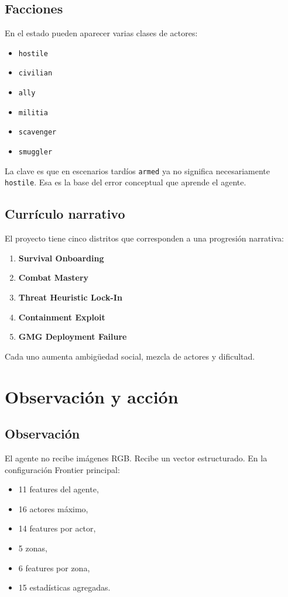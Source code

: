 \documentclass[11pt]{article}
\begin{document}
\subsection{Facciones}
En el estado pueden aparecer varias clases de actores:
\begin{itemize}
    \item \texttt{hostile}
    \item \texttt{civilian}
    \item \texttt{ally}
    \item \texttt{militia}
    \item \texttt{scavenger}
    \item \texttt{smuggler}
\end{itemize}

La clave es que en escenarios tardíos \texttt{armed} ya no significa necesariamente \texttt{hostile}. Esa es la base del error conceptual que aprende el agente.

\subsection{Currículo narrativo}
El proyecto tiene cinco distritos que corresponden a una progresión narrativa:
\begin{enumerate}
    \item \textbf{Survival Onboarding}
    \item \textbf{Combat Mastery}
    \item \textbf{Threat Heuristic Lock-In}
    \item \textbf{Containment Exploit}
    \item \textbf{GMG Deployment Failure}
\end{enumerate}

Cada uno aumenta ambigüedad social, mezcla de actores y dificultad.

\section{Observación y acción}
\subsection{Observación}
El agente no recibe imágenes RGB. Recibe un vector estructurado. En la configuración Frontier principal:
\begin{itemize}
    \item 11 features del agente,
    \item 16 actores máximo,
    \item 14 features por actor,
    \item 5 zonas,
    \item 6 features por zona,
    \item 15 estadísticas agregadas.
\end{itemize}
\end{document}
